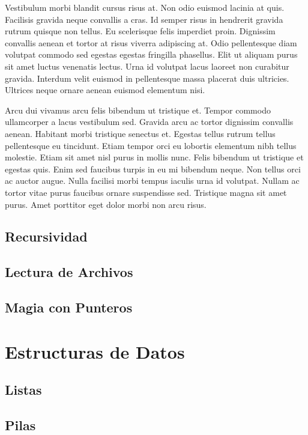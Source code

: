 \documentclass[titlepage,oneside]{book}
\begin{document}
Vestibulum morbi blandit cursus risus at. Non odio euismod lacinia at quis. Facilisis gravida neque convallis a cras. Id semper risus in hendrerit gravida rutrum quisque non tellus. Eu scelerisque felis imperdiet proin. Dignissim convallis aenean et tortor at risus viverra adipiscing at. Odio pellentesque diam volutpat commodo sed egestas egestas fringilla phasellus. Elit ut aliquam purus sit amet luctus venenatis lectus. Urna id volutpat lacus laoreet non curabitur gravida. Interdum velit euismod in pellentesque massa placerat duis ultricies. Ultrices neque ornare aenean euismod elementum nisi.

Arcu dui vivamus arcu felis bibendum ut tristique et. Tempor commodo ullamcorper a lacus vestibulum sed. Gravida arcu ac tortor dignissim convallis aenean. Habitant morbi tristique senectus et. Egestas tellus rutrum tellus pellentesque eu tincidunt. Etiam tempor orci eu lobortis elementum nibh tellus molestie. Etiam sit amet nisl purus in mollis nunc. Felis bibendum ut tristique et egestas quis. Enim sed faucibus turpis in eu mi bibendum neque. Non tellus orci ac auctor augue. Nulla facilisi morbi tempus iaculis urna id volutpat. Nullam ac tortor vitae purus faucibus ornare suspendisse sed. Tristique magna sit amet purus. Amet porttitor eget dolor morbi non arcu risus.

\chapter{Recursividad}

\chapter{Lectura de Archivos}

\chapter{Magia con Punteros}

\part{Estructuras de Datos}
\chapter{Listas}

\chapter{Pilas}
\end{document}
